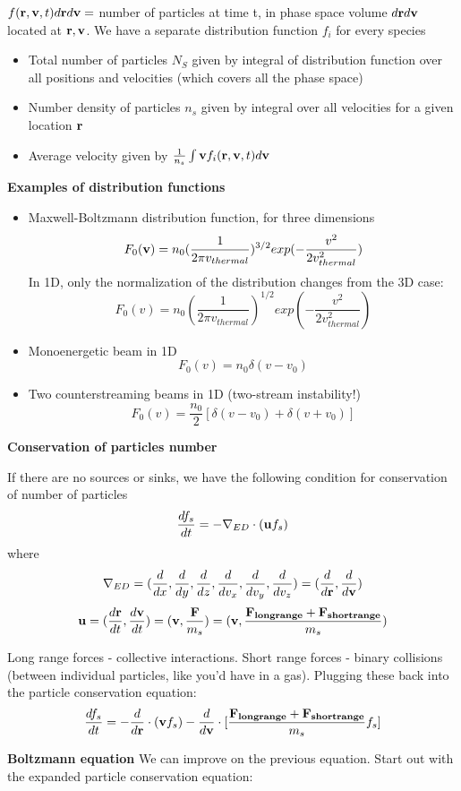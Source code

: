 $f(\mathbf{r}, \mathbf{v}, t) d\mathbf{r} d\mathbf{v} = $ number of particles at time t, in phase space volume $d\mathbf{r} d\mathbf{v}$ located at $\mathbf{r}, \mathbf{v}$. We have a separate distribution function $f_i$ for every species
\begin{itemize}
\item Total number of particles $N_S$ given by integral of distribution function over all positions and velocities (which covers all the phase space)
\item Number density of particles $n_s$ given by integral over all velocities for a given location $\mathbf{r}$ 
\item Average velocity given by $\frac{1}{n_s} \int \mathbf{v} f_i(\mathbf{r}, \mathbf{v}, t)  d\mathbf{v}$
\end{itemize}
\par \textbf{Examples of distribution functions}
\begin{itemize}
	\item Maxwell-Boltzmann distribution function, for three dimensions
	\[ F_0(\mathbf{v}) = n_0 (\frac{1}{2 \pi v_{thermal}})^{3/2} exp(-\frac{v^2}{2 v_{thermal}^2}) \] %
	In 1D, only the normalization of the distribution changes from the 3D case:
	\[ F_0(v) = n_0 (\frac{1}{2 \pi v_{thermal}})^{1/2} exp(-\frac{v^2}{2 v_{thermal}^2}) \]
	\item Monoenergetic beam in 1D
	\[ F_0(v) = n_0 \delta (v-v_0) \]
	\item Two counterstreaming beams in 1D (two-stream instability!)
	\[ F_0(v) = \frac{n_0}{2} [\delta (v-v_0) + \delta(v+v_0)] \]
\end{itemize}

\textbf{Conservation of particles number}

If there are no sources or sinks, we have the following condition for conservation of number of particles
\[ \frac{d f_s}{d t} = -\nabla_{ED} \cdot (\mathbf{u} f_s) \]
where
\[ \nabla_{ED} = ( \frac{d }{d x},\frac{d }{d y},\frac{d }{d z},\frac{d }{d v_x},\frac{d }{d v_y},\frac{d }{d v_z}) = (\frac{d }{d \mathbf{r}}, \frac{d }{d \mathbf{v}}) \]
\[ \mathbf{u} = (\frac{d \mathbf{r}}{d t}, \frac{d \mathbf{v}}{d t}) = (\mathbf{v}, \frac{\mathbf{F}}{m_s}) = (\mathbf{v}, \frac{\mathbf{F_{long range}} + \mathbf{F_{short range}}}{m_s}) \] %

Long range forces - collective interactions. Short range forces - binary collisions (between individual particles, like you'd have in a gas).
Plugging these back into the particle conservation equation:
\[ \frac{d f_s}{d t} = -\frac{d }{d \mathbf{r}} \cdot (\mathbf{v} f_s) - \frac{d }{d \mathbf{v}} \cdot [\frac{\mathbf{F_{long range}} + \mathbf{F_{short range}}}{m_s} f_s] \]

\textbf{Boltzmann equation}
	We can improve on the previous equation. Start out with the expanded particle conservation equation:
	
